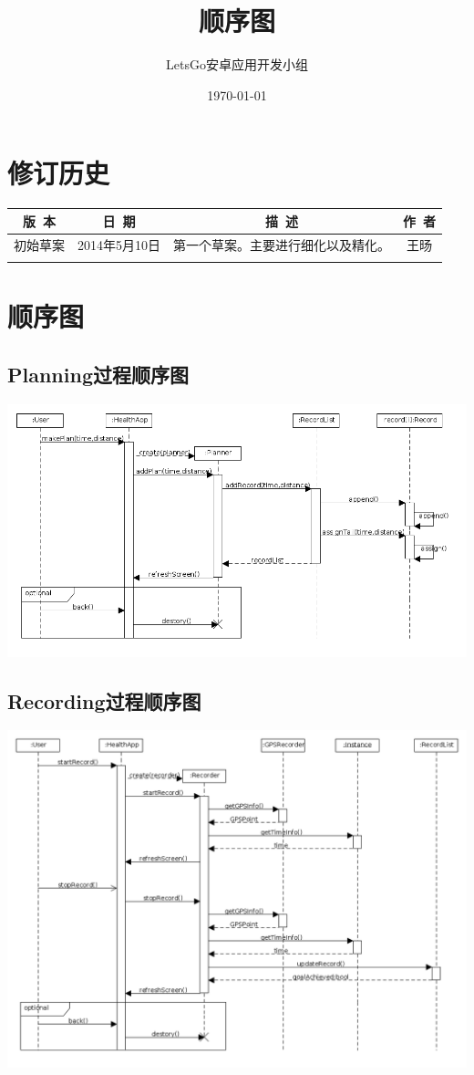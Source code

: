 \documentclass [a4paper,11pt]{article}
\title{顺序图}
\date{\today}
\author{LetsGo安卓应用开发小组}
\begin{document}
	
\maketitle
\section*{修订历史}

\begin{table}[!hbp]
\centering

\begin{tabular*}{\textwidth}{c|c|c|c}
\hline
\rule{0pt}{0.8cm}
版~本 & 日~期 & 描~述 & 作~者\\
\hline
\rule{0pt}{0.6cm}
初始草案 & 2014年5月10日 & 第一个草案。主要进行细化以及精化。 & 王旸\\
\hline
\rule{0pt}{0.6cm}
 &  &  & \\
\hline
\end{tabular*}
\end{table}


\section*{顺序图}	
\subsection*{Planning过程顺序图}
\includegraphics[width=\textwidth]{../SequenceDiagram_Planning.png}
\subsection*{Recording过程顺序图}
\includegraphics[width=\textwidth]{../SequenceDiagram_Recording.png}
\end{document}
